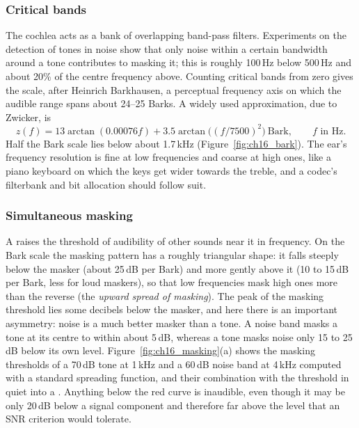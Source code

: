 \subsubsection{Critical bands}

The cochlea acts as a bank of overlapping band-pass filters. Experiments on the detection of tones in
noise show that only noise within a certain bandwidth around a tone contributes to masking it; this
 is roughly 100\,Hz below 500\,Hz and about 20\% of the centre frequency above.
Counting critical bands from zero gives the  scale, after Heinrich Barkhausen, a
perceptual frequency axis on which the audible range spans about 24--25 Barks. A widely used
approximation, due to Zwicker, is
\begin{equation}
z(f)=13\arctan(0.00076f)+3.5\arctan\!\big((f/7500)^2\big)\ \text{Bark},\qquad f\text{ in Hz}.
\label{eq:ch16:bark}
\end{equation}
Half the Bark scale lies below about 1.7\,kHz (Figure~\ref{fig:ch16_bark}). The ear's frequency resolution is fine at low
frequencies and coarse at high ones, like a piano keyboard on which the keys get wider towards the
treble, and a codec's filterbank and bit allocation should follow suit.


\subsubsection{Simultaneous masking}

A  raises the threshold of audibility of other sounds near it in frequency. On the Bark
scale the masking pattern has a roughly triangular shape: it falls steeply below the masker (about
25\,dB per Bark) and more gently above it (10 to 15\,dB per Bark, less for loud maskers), so that low
frequencies mask high ones more than the reverse (the \emph{upward spread of masking}). The peak of the
masking threshold lies some decibels below the masker, and here there is an important asymmetry:
noise is a much better masker than a tone. A noise band masks a tone at its centre to within about
5\,dB, whereas a tone masks noise only 15 to 25\,dB below its own level. Figure~\ref{fig:ch16_masking}(a)
shows the masking thresholds of a 70\,dB tone at 1\,kHz and a 60\,dB noise band at 4\,kHz computed with
a standard spreading function, and their combination with the threshold in quiet into a
. Anything below the red curve is inaudible, even though it may be only
20\,dB below a signal component and therefore far above the level that an SNR criterion would tolerate.

